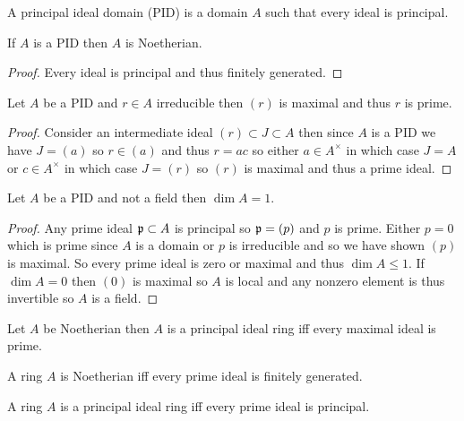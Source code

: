 \documentclass[12pt]{article}
\begin{document}
\begin{definition}
A principal ideal domain (PID) is a domain $A$ such that every ideal is principal. 
\end{definition}

\begin{lemma}
If $A$ is a PID then $A$ is Noetherian.
\end{lemma}

\begin{proof}
Every ideal is principal and thus finitely generated.
\end{proof}

\begin{lemma}
Let $A$ be a PID and $r \in A$ irreducible then $(r)$ is maximal and thus $r$ is prime. 
\end{lemma}

\begin{proof}
Consider an intermediate ideal $(r) \subset J \subset A$ then since $A$ is a PID we have $J = (a)$ so $r \in (a)$ and thus $r = ac$ so either $a \in A^\times$ in which case $J = A$ or $c \in A^\times$ in which case $J = (r)$ so $(r)$ is maximal and thus a prime ideal.
\end{proof}

\begin{theorem}
Let $A$ be a PID and not a field then $\dim{A} = 1$.
\end{theorem}

\begin{proof}
Any prime ideal $\mathfrak{p} \subset A$ is principal so $\mathfrak{p} = (p)$ and $p$ is prime. Either $p = 0$ which is prime since $A$ is a domain or $p$ is irreducible and so we have shown $(p)$ is maximal. So every prime ideal is zero or maximal and thus $\dim{A} \le 1$. If $\dim{A} = 0$ then $(0)$ is maximal so $A$ is local and any nonzero element is thus invertible so $A$ is a field. 
\end{proof}

\begin{theorem}[Kaplansky]
Let $A$ be Noetherian then $A$ is a principal ideal ring iff every maximal ideal is prime.
\end{theorem}

\begin{theorem}[Cohen]
A ring $A$ is Noetherian iff every prime ideal is finitely generated.
\end{theorem}

\begin{corollary}
A ring $A$ is a principal ideal ring iff every prime ideal is principal. 
\end{corollary}
\end{document}
